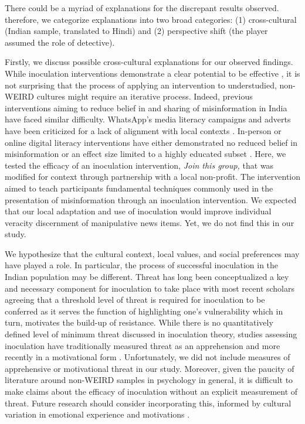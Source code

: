 \documentclass[empirical, authordate]{jote-new-article}
\begin{document}
There could be a myriad of explanations for the discrepant results observed. therefore, we categorize explanations into two broad categories: (1) cross-cultural (Indian sample, translated to Hindi) and (2) perspective shift (the player assumed the role of detective).

Firstly, we discuss possible cross-cultural explanations for our observed findings. While inoculation interventions demonstrate a clear potential to be effective \parencite{Traberg2022}, it is not surprising that the process of applying an intervention to understudied, non-WEIRD cultures \parencite{Henrich2010, Rad2018} might require an iterative process. Indeed, previous interventions aiming to reduce belief in and sharing of misinformation in India have faced similar difficulty. \mbox{WhatsApp}'s media literacy campaigns and adverts have been criticized for a lack of alignment with local contexts \parencite{Medeiros2021}. In-person or online digital literacy interventions have either demonstrated no reduced belief in misinformation \parencite{Badrinathan2021} or an effect size limited to a highly educated subset \parencite{Guess2020}. Here, we tested the efficacy of an inoculation intervention, \emph{Join this group, }that was modified for context through partnership with a local non-profit. The intervention aimed to teach participants fundamental techniques commonly used in the presentation of misinformation through an inoculation intervention. We expected that our local adaptation and use of inoculation would improve individual veracity discernment of manipulative news items. Yet, we do not find this in our study.

We hypothesize that the cultural context, local values, and social preferences may have played a role. In particular, the process of successful inoculation in the Indian population may be different. Threat has long been conceptualized a key and necessary component for inoculation to take place \parencite{McGuire1964} with most recent scholars agreeing that a threshold level of threat is required for inoculation to be conferred \parencite{Compton2021} as it serves the function of highlighting one's vulnerability which in turn, motivates the build-up of resistance. While there is no quantitatively defined level of minimum threat discussed in inoculation theory, studies assessing inoculation have traditionally measured threat as an apprehension \parencite{Ivanov2022, Wood2007} and more recently in a motivational form \parencite{Banas2017}. Unfortunately, we did not include measures of apprehensive or motivational threat in our study. Moreover, given the paucity of literature around non-WEIRD samples in psychology in general, it is difficult to make claims about the efficacy of inoculation without an explicit measurement of threat. Future research should consider incorporating this, informed by cultural variation in emotional experience and motivations \parencite{Kwan2016, Lim2004, Matsumoto2008, Mesquita2003}.
\end{document}
